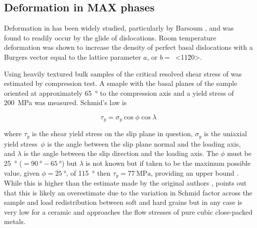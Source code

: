 \subsection{Deformation in MAX phases}

Deformation in  has been widely studied, particularly by Barsoum \cite{Farber1998,Barsoum1999,Farber1999,Barsoum1999dislocs_kinkbands,Barsoum2001}, and was found to readily occur by the glide of dislocations. Room temperature deformation was shown to increase the density of perfect basal dislocations with a Burgers vector equal to the lattice parameter $a$, or $b =$~<11\={2}0>. 

Using heavily textured bulk samples of  the critical resolved shear stress of  was estimated by compression test. A smaple with the basal planes of the sample oriented at approximately \SI{65}{\degree} to the compression axis and a yield stress of \SI{200}{\mega\pascal} was measured. Schmid's law is 

\begin{equation}
\tau_y = \sigma_y \cos{\phi} \cos{\lambda}
\end{equation}

where $\tau_y$ is the shear yield stress on the slip plane in question, $\sigma_y$ is the uniaxial yield stress\ $\phi$ is the angle between the slip plane normal and the loading axis, and $\lambda$ is the angle between the slip direction and the loading axis. The $\phi$ must be \SI{25}{\degree} ($=\SI{90}{\degree} - \SI{65}{\degree}$) but $\lambda$ is not known but if taken to be the maximum possible value, given $\phi=\SI{25}{\degree}$, of \SI{115}{\degree} then $\tau_y = \SI{77}{\mega\pascal}$, providing an upper bound \cite{Humphrey2012}. While this is higher than the estimate made by the original authors \cite{Barsoum1999}, \citet{Humphrey2012} points out that this is likely an overestimate due to the variation in Schmid factor across the sample and load redistribution between soft and hard grains but in any case is very low for a ceramic and approaches the flow stresses of pure cubic close-packed metals.


%
%
%
%
%
%
%
%
%
%
%
%


